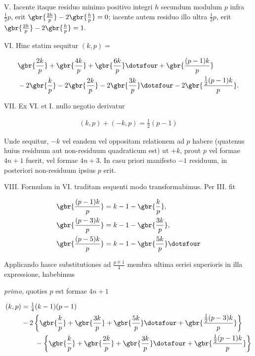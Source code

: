 V.  Iacente itaque residuo minimo positivo integri $h$ secundum modulum $p$ infra $\tfrac12p$, erit $\gbr{\frac{2h}{p}}-2\gbr{\frac{h}{p}}=0$; iacente autem residuo illo ultra $\tfrac12p$, erit $\gbr{\frac{2h}{p}}-2\gbr{\frac{h}{p}}=1.$

VI.  Hinc statim sequitur $(k,p)=$

\[
\begin{aligned}
&\gbr{\frac{2k}{p}}+\gbr{\frac{4k}{p}}+\gbr{\frac{6k}{p}}\dotsfour+\gbr{\frac{(p-1)k}{p}}\\
&-2\gbr{\frac{k}{p}}-2\gbr{\frac{2k}{p}}-2\gbr{\frac{3k}{p}}\dotsfour-2\gbr{\frac{\frac12(p-1)k}{p}}.
\end{aligned}
\]

VII.  Ex VI. et I. nullo negotio derivatur

\[
\begin{aligned}
(k,p)+(-k,p)=\tfrac12(p-1)
\end{aligned}
\]

Unde sequitur, $-k$ vel eandem vel oppositam relationem ad $p$ habere (quatenus huius residuum aut non-residuum quadraticum est) ut $+k$, prout $p$ vel formae $4n+1$ fuerit, vel formae $4n+3$.  In casu priori manifesto $-1$ residuum, in posteriori non-residuum ipsius $p$ erit.

VIII.  Formulam in VI. traditam sequenti modo transformabimus. Per III. fit

\[
\begin{aligned}
\gbr{\frac{(p-1)k}{p}}&=k-1-\gbr{\frac{k}{p}},\\
\gbr{\frac{(p-3)k}{p}}&=k-1-\gbr{\frac{3k}{p}},\\
\gbr{\frac{(p-5)k}{p}}&=k-1-\gbr{\frac{5k}{p}}\dotsfour
\end{aligned}
\]

Applicando hasce substitutiones ad $\frac{p\mp1}{4}$ membra ultima seriei superioris in illa expressione, habebimus

\emph{primo}, quoties $p$ est formae $4n+1$

\[
\begin{aligned}
(k,p)&=\tfrac14(k-1)(p-1)\\
& -2\left\{\gbr{\frac{k}{p}}+\gbr{\frac{3k}{p}}+\gbr{\frac{5k}{p}}\dotsfour+\gbr{\frac{\frac12(p-3)k}{p}}\right\}\\
&\qquad-\left\{\gbr{\frac{k}{p}}+\gbr{\frac{2k}{p}}+\gbr{\frac{3k}{p}}\dotsfour+\gbr{\frac{\frac12(p-1)k}{p}}\right\}
\end{aligned}
\]

